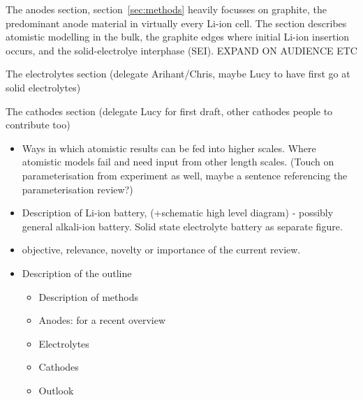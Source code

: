 \documentclass[../main.tex]{subfiles}
\begin{document}
The anodes section, section~\ref{sec:methods} heavily focusses on graphite, the predominant anode material in virtually every Li-ion cell. The section describes atomistic modelling in the bulk, the graphite edges where initial Li-ion insertion occurs, and the solid-electrolye interphase (SEI). EXPAND ON AUDIENCE ETC

The electrolytes section (delegate Arihant/Chris, maybe Lucy to have first go at solid electrolytes)

The cathodes section (delegate Lucy for first draft, other cathodes people to contribute too)

\begin{itemize}
    \item Ways in which atomistic results can be fed into higher scales. Where atomistic models fail and need input from other length scales. (Touch on parameterisation from experiment as well, maybe a sentence referencing the parameterisation review?)
    \item \textbf{} Description of Li-ion battery, (+schematic high level diagram) - possibly general alkali-ion battery. Solid state electrolyte battery as separate figure.
    \item objective, relevance, novelty or importance of the current review.
    \item Description of the outline
        \begin{itemize}
           \item Description of methods
           \item Anodes: for a recent overview 
           \item Electrolytes
           \item Cathodes
           \item Outlook
        \end{itemize}
\end{itemize}
\end{document}
